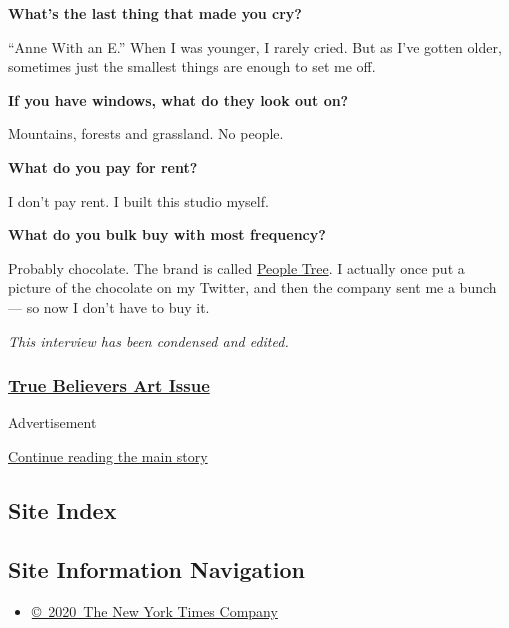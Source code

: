 \textbf{What's the last thing that made you cry?}

``Anne With an E.'' When I was younger, I rarely cried. But as I've
gotten older, sometimes just the smallest things are enough to set me
off.

\textbf{If you have windows, what do they look out on?}

Mountains, forests and grassland. No people.

\textbf{What do you pay for rent?}

I don't pay rent. I built this studio myself.

\textbf{What do you bulk buy with most frequency?}

Probably chocolate. The brand is called
\href{https://www.peopletree.co.jp/choco/index.html}{People Tree}. I
actually once put a picture of the chocolate on my Twitter, and then the
company sent me a bunch --- so now I don't have to buy it.

\emph{This interview has been condensed and edited.}

\hypertarget{true-believers-art-issue}{%
\subsubsection{\texorpdfstring{\href{https://www.nytimes3xbfgragh.onion/issue/t-magazine/2020/07/02/true-believers-art-issue}{True
Believers Art
Issue}}{True Believers Art Issue}}\label{true-believers-art-issue}}

Advertisement

\protect\hyperlink{after-bottom}{Continue reading the main story}

\hypertarget{site-index}{%
\subsection{Site Index}\label{site-index}}

\hypertarget{site-information-navigation}{%
\subsection{Site Information
Navigation}\label{site-information-navigation}}

\begin{itemize}
\tightlist
\item
  \href{https://help.nytimes3xbfgragh.onion/hc/en-us/articles/115014792127-Copyright-notice}{©~2020~The
  New York Times Company}
\end{itemize}

